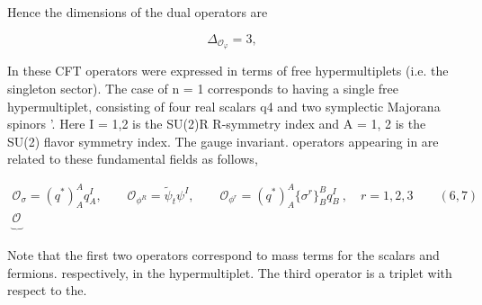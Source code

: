 \documentclass{article}
\begin{document}
Hence the dimensions of the dual operators are


\begin{equation}
\Delta _ { \mathcal { O } _ { \varphi } } = 3, ~
\end{equation}


In these CFT operators were expressed in terms of free hypermultiplets (i.e. the singleton
sector). The case of n = 1 corresponds to having a single free hypermultiplet, consisting of
four real scalars q4 and two symplectic Majorana spinors '. Here I = 1,2 is the SU(2)R
R-symmetry index and A = 1, 2 is the SU(2) flavor symmetry index. The gauge invariant.
operators appearing in are related to these fundamental fields as follows,


\begin{equation}
\begin{array} { r } { \mathcal { O } _ { \sigma } = ( q ^ { * } ) _ { A } ^ { A } q _ { A } ^ { I }, \qquad \mathcal { O } _ { \phi ^ { R } } = \tilde { \psi } _ { t } \psi ^ { I }, \qquad \mathcal { O } _ { \phi ^ { r } } = \left ( q ^ { * } \right ) _ { A } ^ { A } \{ \sigma ^ { r } \} _ { B } ^ { B } q _ { B } ^ { I } ~, \quad r = 1, 2, 3 \qquad ( 6, 7 ) } \\ { \underbrace { \mathcal { O } _ {}}}\end{array}
\end{equation}


Note that the first two operators correspond to mass terms for the scalars and fermions.
respectively, in the hypermultiplet. The third operator is a triplet with respect to the.
\end{document}
